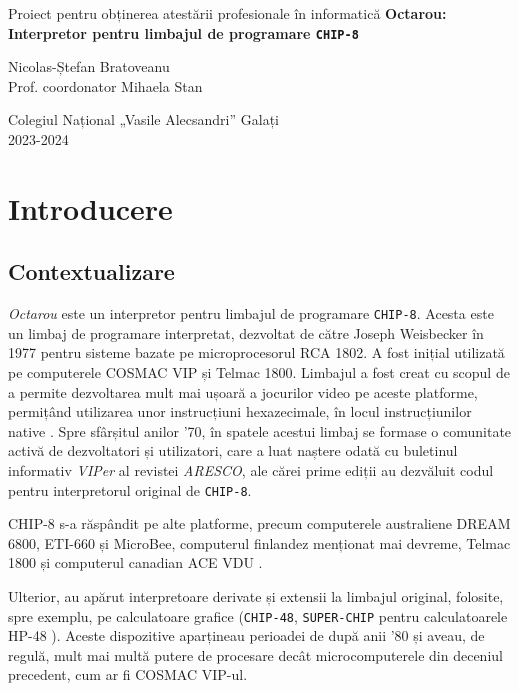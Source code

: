 \documentclass[a4paper]{article}
\begin{document}
\begin{titlepage}
	\begin{center}
		\Large Proiect pentru obținerea atestării profesionale în informatică
		\vfill
		\LARGE\textbf{Octarou: Interpretor pentru limbajul de programare \texttt{CHIP-8}}

		\vspace{8pt}
		\Large Nicolas-Ștefan Bratoveanu \\
		\large Prof. coordonator Mihaela Stan

		\vfill
		\Large
		Colegiul Național „Vasile Alecsandri” Galați \\
		2023-2024
	\end{center}
\end{titlepage}

\tableofcontents
\newpage

\section{Introducere}
\subsection{Contextualizare}
\textit{Octarou} este un interpretor pentru limbajul de programare \texttt{CHIP-8}. Acesta este un limbaj de programare interpretat, dezvoltat
de către Joseph Weisbecker în 1977 pentru sisteme bazate pe microprocesorul RCA 1802. A fost inițial utilizată pe computerele COSMAC VIP și Telmac
1800. Limbajul a fost creat cu scopul de a permite dezvoltarea mult mai ușoară a jocurilor video pe aceste platforme, permițând utilizarea unor
instrucțiuni hexazecimale, în locul instrucțiunilor native \cite{langhoff}. Spre sfârșitul anilor '70, în spatele acestui limbaj se formase o comunitate activă
de dezvoltatori și utilizatori, care a luat naștere odată cu buletinul informativ \textit{VIPer} al revistei \textit{ARESCO}, ale cărei prime
ediții au dezvăluit codul pentru interpretorul original de \texttt{CHIP-8}.

CHIP-8 s-a răspândit pe alte platforme, precum computerele australiene DREAM 6800, ETI-660 și MicroBee, computerul finlandez menționat mai devreme,
Telmac 1800 și computerul canadian ACE VDU \cite{langhoff}.

Ulterior, au apărut interpretoare derivate și extensii la limbajul original, folosite, spre exemplu, pe calculatoare grafice (\texttt{CHIP-48}, \texttt{SUPER-CHIP}
pentru calculatoarele HP-48 \cite{langhoff}). Aceste dispozitive aparțineau perioadei de după anii '80 și aveau, de regulă, mult mai multă putere de procesare
decât microcomputerele din deceniul precedent, cum ar fi COSMAC VIP-ul.
\end{document}
